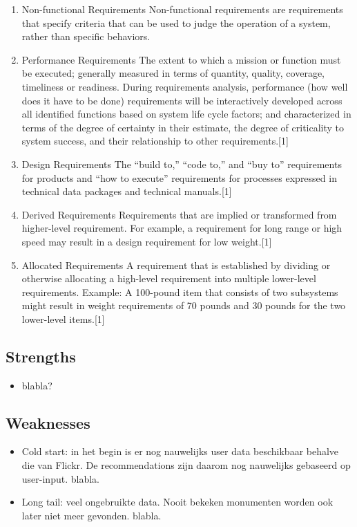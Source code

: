 \documentclass{article}
\begin{document}
\begin{enumerate}
	\item{Non-functional Requirements}
	Non-functional requirements are requirements that specify criteria that can be used to judge the operation of a system, rather than specific behaviors.
	\item{Performance Requirements}
	The extent to which a mission or function must be executed; generally measured in terms of quantity, quality, coverage, timeliness or readiness. During requirements analysis, performance (how well does it have to be done) requirements will be interactively developed across all identified functions based on system life cycle factors; and characterized in terms of the degree of certainty in their estimate, the degree of criticality to system success, and their relationship to other requirements.[1]
	\item{Design Requirements}
	The “build to,” “code to,” and “buy to” requirements for products and “how to execute” requirements for processes expressed in technical data packages and technical manuals.[1]
	\item{Derived Requirements}
	Requirements that are implied or transformed from higher-level requirement. For example, a requirement for long range or high speed may result in a design requirement for low weight.[1]
\item{Allocated Requirements}
	A requirement that is established by dividing or otherwise allocating a high-level requirement into multiple lower-level requirements. Example: A 100-pound item that consists of two subsystems might result in weight requirements of 70 pounds and 30 pounds for the two lower-level items.[1]
	
\end{enumerate}
\subsection{Strengths}
\begin{itemize}
\item blabla?
\end{itemize}
\subsection{Weaknesses}
\begin{itemize}
\item Cold start: in het begin is er nog nauwelijks user data beschikbaar behalve die van Flickr. De recommendations zijn daarom nog nauwelijks gebaseerd op user-input. blabla.
\item Long tail: veel ongebruikte data. Nooit bekeken monumenten worden ook later niet meer gevonden. blabla.
\end{itemize}
\end{document}
